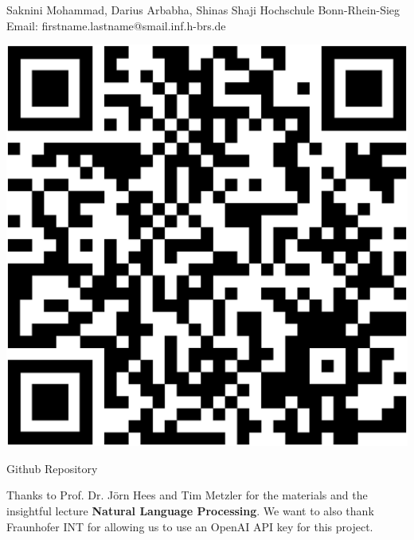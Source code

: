 {
	\vspace*{1cm}
	\begin{minipage}{0.75\linewidth}
		\vspace*{-2.5cm}
		Saknini Mohammad, Darius Arbabha, Shinas Shaji\newline
		Hochschule Bonn-Rhein-Sieg\newline
		Email: firstname.lastname@smail.inf.h-brs.de\newline
	\end{minipage}
	\begin{minipage}{0.24\linewidth}
		\centering
		\vspace{-1.5cm}
		\begin{tikzfigure}
			\includegraphics[scale=0.125]{figures/qrcode.eps}
		\end{tikzfigure}
		Github Repository
	\end{minipage}
	\vspace*{-3cm}
	
}
{
	
	Thanks to Prof. Dr. Jörn Hees and Tim Metzler for the materials and the insightful lecture \textbf{Natural Language Processing}.\newline
	We want to also thank Fraunhofer INT for allowing us to use an OpenAI API key for this project.
}